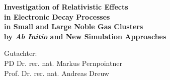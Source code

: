 \thispagestyle{empty}

\vspace*{2cm}

\begin{center}
 \Large
 \textbf{Investigation of Relativistic Effects\\[1ex]
         in Electronic Decay Processes\\[1ex]
         in %
         Small and Large Noble Gas Clusters\\[1ex]
         by \emph{Ab Initio} and New Simulation Approaches}


\vfill
\end{center}

\large
Gutachter:\\[2ex]
PD Dr. rer. nat. Markus Pernpointner\\
Prof. Dr. rer. nat. Andreas Dreuw

\normalsize
\cleardoublepage
